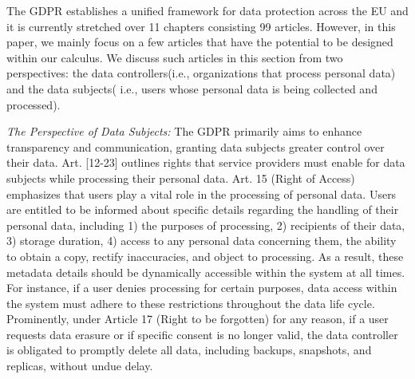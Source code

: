 The GDPR establishes a unified framework for data protection across the EU and it is currently stretched over 11 chapters consisting 99 articles.%
However, in this paper, we mainly focus on a few articles that have the potential to be designed within our calculus. We discuss such articles in this section from two perspectives: the data controllers(i.e., organizations that process personal data) and the data subjects( i.e., users whose personal data is being collected and processed).

\emph{The Perspective of Data Subjects:} The GDPR primarily aims to enhance transparency and communication, granting data subjects greater control over their data. Art. [12-23] outlines rights that service providers must enable for data subjects while processing their personal data. Art. 15 (Right of Access) emphasizes that users play a vital role in the processing of personal data. Users are entitled to be informed about specific details regarding the handling of their personal data, including 1) the purposes of processing, 2) recipients of their data, 3) storage duration, 4) access to any personal data concerning them, the ability to obtain a copy, rectify inaccuracies, and object to processing.
As a result, these metadata details should be dynamically accessible within the system at all times. For instance, if a user denies processing for certain purposes,  data access within the system must adhere to these restrictions throughout the data life cycle. Prominently, under Article 17 (Right to be forgotten) for any reason, if a user requests data erasure or if specific consent is no longer valid, the data controller is obligated to promptly delete all data, including backups, snapshots, and replicas, without undue delay.

